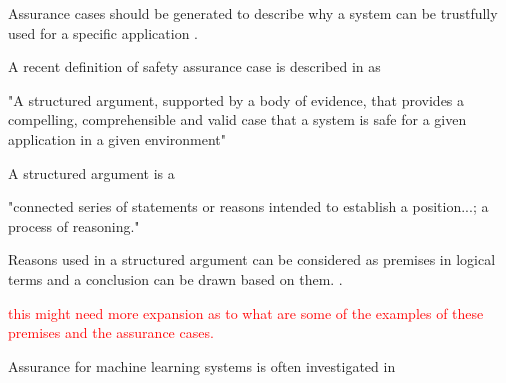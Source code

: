 Assurance cases should be generated to describe why a system can be trustfully used for a specific application \cite{Ashmore2021}.

A recent definition of safety assurance case is described in \cite{Bloomfield2010} as


\begin{displayquote}[][]
"A structured argument, supported by a body of evidence, that provides a compelling, comprehensible and valid case that a system is safe for a given application in a given environment"
\end{displayquote}


A structured argument is a \cite{Omg2010}
\begin{displayquote}[][]
"connected series of statements or reasons intended to establish a position...; a process of reasoning."
\end{displayquote}

Reasons used in a structured argument can be considered as premises in logical terms and a conclusion can be drawn based on them. \cite{Omg2010}. 

\textcolor{red}{this might need more expansion as to what are some of the examples of these premises and the assurance cases.}

Assurance for machine learning systems is often investigated in 